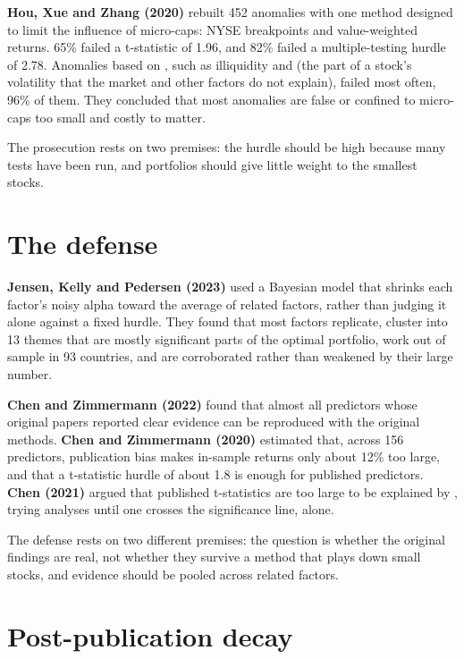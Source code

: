 \textbf{Hou, Xue and Zhang (2020)} rebuilt 452 anomalies with one method designed to limit the influence of micro-caps: NYSE breakpoints and value-weighted returns. 65\% failed a t-statistic of 1.96, and 82\% failed a multiple-testing hurdle of 2.78. Anomalies based on , such as illiquidity and  (the part of a stock's volatility that the market and other factors do not explain), failed most often, 96\% of them. They concluded that most anomalies are false or confined to micro-caps too small and costly to matter.

The prosecution rests on two premises: the hurdle should be high because many tests have been run, and portfolios should give little weight to the smallest stocks.

\section{The defense}
\label{sec:19-defense}

\textbf{Jensen, Kelly and Pedersen (2023)} used a Bayesian model that shrinks each factor's noisy alpha toward the average of related factors, rather than judging it alone against a fixed hurdle. They found that most factors replicate, cluster into 13 themes that are mostly significant parts of the optimal portfolio, work out of sample in 93 countries, and are corroborated rather than weakened by their large number.

\textbf{Chen and Zimmermann (2022)} found that almost all predictors whose original papers reported clear evidence can be reproduced with the original methods. \textbf{Chen and Zimmermann (2020)} estimated that, across 156 predictors, publication bias makes in-sample returns only about 12\% too large, and that a t-statistic hurdle of about 1.8 is enough for published predictors. \textbf{Chen (2021)} argued that published t-statistics are too large to be explained by , trying analyses until one crosses the significance line, alone.

The defense rests on two different premises: the question is whether the original findings are real, not whether they survive a method that plays down small stocks, and evidence should be pooled across related factors.

\section{Post-publication decay}
\label{sec:19-decay}

